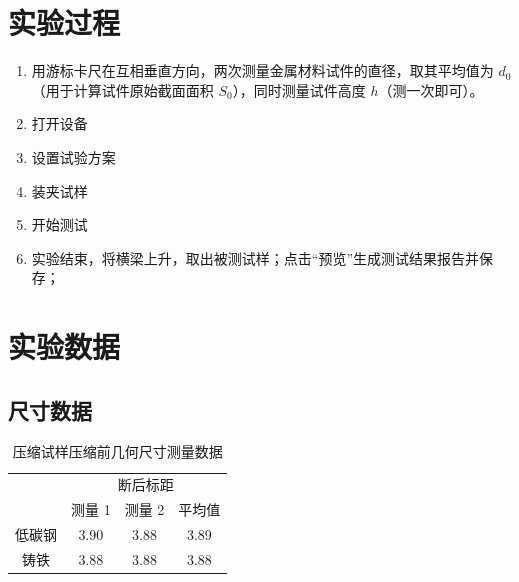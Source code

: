 \documentclass[a4paper,utf8]{article}
\begin{document}
\section{实验过程}%
    \begin{enumerate}
        \item 用游标卡尺在互相垂直方向，两次测量金属材料试件的直径，取其平均值为 $d_0$（用于计算试件原始截面面积 $S_0$），同时测量试件高度 $h$（测一次即可）。
        \item 打开设备
        \item 设置试验方案
        \item 装夹试样
        \item 开始测试
        \item 实验结束，将横梁上升，取出被测试样；点击“预览”生成测试结果报告并保存；
    \end{enumerate}
\section{实验数据}
    \subsection{尺寸数据}
    \begin{table}[!ht]
        \caption{压缩试样压缩前几何尺寸测量数据}
        \begin{tabular}{*{4}{c}}\toprule
            & \multicolumn{3}{c}{断后标距}\\
            & 测量 1 & 测量 2 & 平均值 \\ \midrule
            低碳钢 & 3.90 & 3.88 & 3.89 \\ 
            铸铁 & 3.88 & 3.88 & 3.88 \\ \bottomrule
        \end{tabular}
    \end{table}
\end{document}
